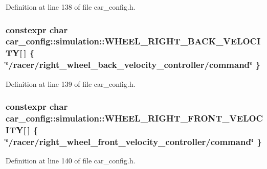 Definition at line 138 of file car\+\_\+config.\+h.

\subsubsection[{\texorpdfstring{W\+H\+E\+E\+L\+\_\+\+R\+I\+G\+H\+T\+\_\+\+B\+A\+C\+K\+\_\+\+V\+E\+L\+O\+C\+I\+TY}{WHEEL_RIGHT_BACK_VELOCITY}}]{\setlength{\rightskip}{0pt plus 5cm}constexpr char car\+\_\+config\+::simulation\+::\+W\+H\+E\+E\+L\+\_\+\+R\+I\+G\+H\+T\+\_\+\+B\+A\+C\+K\+\_\+\+V\+E\+L\+O\+C\+I\+TY\mbox{[}$\,$\mbox{]} \{ \char`\"{}/racer/right\+\_\+wheel\+\_\+back\+\_\+velocity\+\_\+controller/command\char`\"{} \}}\hypertarget{namespacecar__config_1_1simulation_a824b4ee5d2b14eb92a017605678ada71}{}\label{namespacecar__config_1_1simulation_a824b4ee5d2b14eb92a017605678ada71}


Definition at line 139 of file car\+\_\+config.\+h.

\subsubsection[{\texorpdfstring{W\+H\+E\+E\+L\+\_\+\+R\+I\+G\+H\+T\+\_\+\+F\+R\+O\+N\+T\+\_\+\+V\+E\+L\+O\+C\+I\+TY}{WHEEL_RIGHT_FRONT_VELOCITY}}]{\setlength{\rightskip}{0pt plus 5cm}constexpr char car\+\_\+config\+::simulation\+::\+W\+H\+E\+E\+L\+\_\+\+R\+I\+G\+H\+T\+\_\+\+F\+R\+O\+N\+T\+\_\+\+V\+E\+L\+O\+C\+I\+TY\mbox{[}$\,$\mbox{]} \{ \char`\"{}/racer/right\+\_\+wheel\+\_\+front\+\_\+velocity\+\_\+controller/command\char`\"{} \}}\hypertarget{namespacecar__config_1_1simulation_ad0fb8a1c1f51bc790b995c81b07a04ea}{}\label{namespacecar__config_1_1simulation_ad0fb8a1c1f51bc790b995c81b07a04ea}


Definition at line 140 of file car\+\_\+config.\+h.

